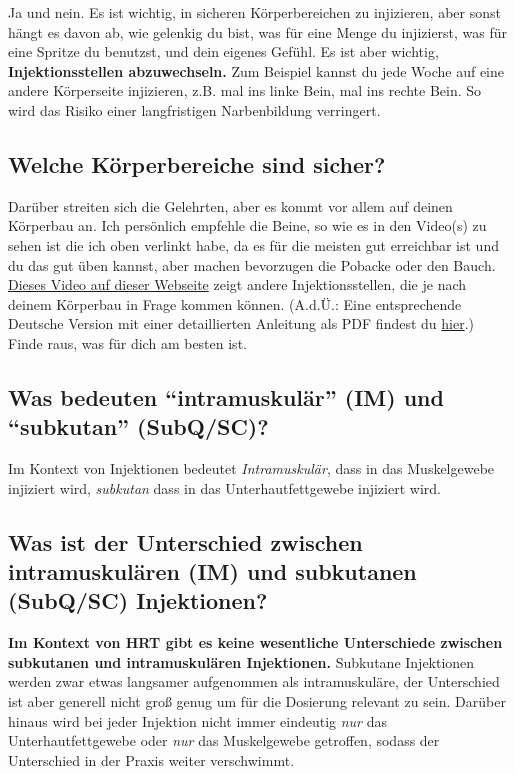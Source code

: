 \documentclass{article}
\begin{document}
Ja und nein. Es ist wichtig, in sicheren Körperbereichen zu injizieren, aber sonst hängt es davon ab, wie gelenkig du bist, was für eine Menge du injizierst, was für eine Spritze du benutzst, und dein eigenes Gefühl. Es ist aber wichtig, \textbf{Injektionsstellen abzuwechseln.} Zum Beispiel kannst du jede Woche auf eine andere Körperseite injizieren, z.B. mal ins linke Bein, mal ins rechte Bein. So wird das Risiko einer langfristigen Narbenbildung verringert.

\subsection{Welche Körperbereiche sind sicher?}

Darüber streiten sich die Gelehrten, aber es kommt vor allem auf deinen Körperbau an. Ich persönlich empfehle die Beine, so wie es in den Video(s) zu sehen ist die ich oben verlinkt habe, da es für die meisten gut erreichbar ist und du das gut üben kannst, aber machen bevorzugen die Pobacke oder den Bauch. \href{https://vertisis.com/articles/how-to-self-administer-a-subcutaneous-injection}{Dieses Video auf dieser Webseite} zeigt andere Injektionsstellen, die je nach deinem Körperbau in Frage kommen können. (A.d.Ü.: Eine entsprechende Deutsche Version mit einer detaillierten Anleitung als PDF findest du \href{https://www.bk-trier.de/media-bkt/docs/PIZ_HZ_Subkutane_Injektion_2021.pdf}{hier}.) Finde raus, was für dich am besten ist.

\subsection{Was bedeuten “intramuskulär” (IM) und “subkutan” (SubQ/SC)?}

Im Kontext von Injektionen bedeutet \textit{Intramuskulär}, dass in das Muskelgewebe injiziert wird, \textit{subkutan} dass in das Unterhautfettgewebe injiziert wird.

\subsection{Was ist der Unterschied zwischen intramuskulären (IM) und subkutanen (SubQ/SC) Injektionen?}

\textbf{Im Kontext von HRT gibt es keine wesentliche Unterschiede zwischen subkutanen und intramuskulären Injektionen.} Subkutane Injektionen werden zwar etwas langsamer aufgenommen als intramuskuläre, der Unterschied ist aber generell nicht groß genug um für die Dosierung relevant zu sein. Darüber hinaus wird bei jeder Injektion nicht immer eindeutig \textit{nur } das Unterhautfettgewebe oder \textit{nur } das Muskelgewebe getroffen, sodass der Unterschied in der Praxis weiter verschwimmt.
\end{document}
